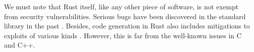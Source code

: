 We must note that Rust itself, like any other piece of software,
is not exempt from security vulnerabilities.
Serious bugs have been discovered in the standard library in the past \cite{davidoff2018}.
Besides, code generation in Rust also includes mitigations
to exploits of various kinds \cite[Chap. 11]{rustc-book}.
However, this is far from the well-known issues in C and C++.